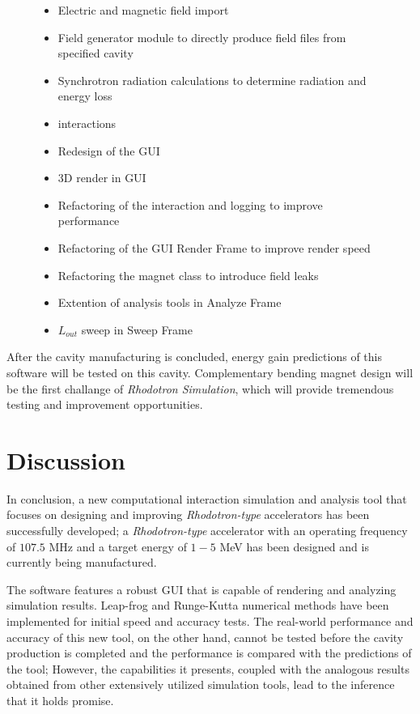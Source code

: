 \documentclass[a4paper,oneside,12pt]{report}
\numberwithin{equation}{chapter}
\begin{document}
\begin{figure}[H]
    \begin{minipage}[t]{0.5\textwidth}
        \begin{itemize}
            \item Electric and magnetic field import
            \item Field generator module to directly produce field files from specified cavity
            \item Synchrotron radiation calculations to determine radiation and energy loss
            \item \ee interactions
            \item Redesign of the GUI
            \item 3D render in GUI
        \end{itemize}
    \end{minipage}
    \begin{minipage}[t]{0.5\textwidth}
        \begin{itemize}
            \item Refactoring of the \eEM interaction and logging to improve performance
            \item Refactoring of the GUI Render Frame to improve render speed
            \item Refactoring the magnet class to introduce field leaks
            \item Extention of analysis tools in Analyze Frame
            \item $L_{out}$ sweep in Sweep Frame
        \end{itemize}
    \end{minipage}
\vspace{-10pt}\end{figure}

After the cavity manufacturing is concluded, energy gain predictions of this software will be tested on this cavity. 
Complementary bending magnet design will be the first challange of \textit{Rhodotron Simulation}, which will provide tremendous testing and improvement opportunities.

\section{Discussion}
In conclusion, a new computational \eEM interaction simulation and analysis tool that focuses on designing and improving \textit{Rhodotron-type} accelerators has been successfully developed; 
a \textit{Rhodotron-type} accelerator with an operating frequency of $107.5$ MHz and a target energy of $1-5$ MeV has been designed and is currently being manufactured.

The software features a robust GUI that is capable of rendering and analyzing simulation results.
Leap-frog and Runge-Kutta numerical methods have been implemented for initial speed and accuracy tests.
The real-world performance and accuracy of this new tool, on the other hand, cannot be tested
before the cavity production is completed and the performance is compared with the predictions of the tool;
However, the capabilities it presents, coupled with the analogous results obtained from other extensively utilized simulation tools, 
lead to the inference that it holds promise.
\end{document}
